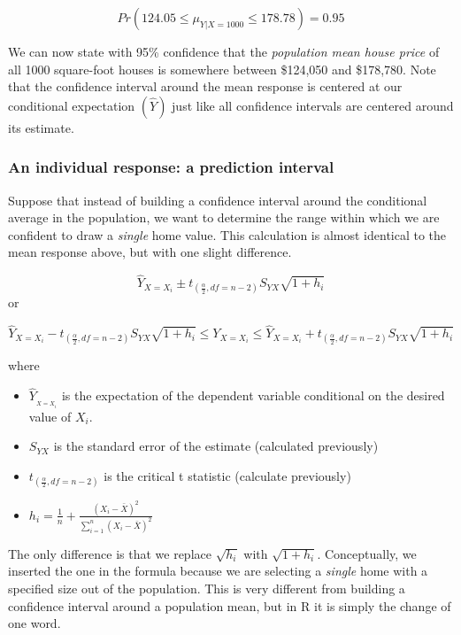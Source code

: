 \documentclass[
]{book}
\begin{document}
\[Pr(124.05\leq\mu_{Y|X=1000}\leq178.78)=0.95\]

We can now state with 95\% confidence that the \emph{population mean house price} of all 1000 square-foot houses is somewhere between \$124,050 and \$178,780. Note that the confidence interval around the mean response is centered at our conditional expectation \((\hat{Y})\) just like all confidence intervals are centered around its estimate.

\hypertarget{an-individual-response-a-prediction-interval}{%
\subsubsection*{An individual response: a prediction interval}\label{an-individual-response-a-prediction-interval}}

Suppose that instead of building a confidence interval around the conditional average in the population, we want to determine the range within which we are confident to draw a \emph{single} home value. This calculation is almost identical to the mean response above, but with one slight difference.

\[ \hat{Y}_{X=X_i} \pm t_{(\frac{\alpha}{2},df=n-2)}S_{YX} \sqrt{1+h_i}\]
or

\[ \hat{Y}_{X=X_i} - t_{(\frac{\alpha}{2},df=n-2)}S_{YX} \sqrt{1+h_i} \leq Y_{X=X_i} \leq \hat{Y}_{X=X_i} + t_{(\frac{\alpha}{2},df=n-2)}S_{YX} \sqrt{1+h_i}\]

where

\begin{itemize}
\item
  \(\hat{Y}__{X=X_i}\) is the expectation of the dependent variable conditional on the desired value of \(X_i\).
\item
  \(S_{YX}\) is the standard error of the estimate (calculated previously)
\item
  \(t_{(\frac{\alpha}{2},df=n-2)}\) is the critical t statistic (calculate previously)
\item
  \(h_i = \frac{1}{n}+\frac{(X_i - \bar{X})^2}{\sum_{i=1}^n(X_i - \bar{X})^2}\)
\end{itemize}

The only difference is that we replace \(\sqrt{h_i}\) with \(\sqrt{1+h_i}\). Conceptually, we inserted the one in the formula because we are selecting a \emph{single} home with a specified size out of the population. This is very different from building a confidence interval around a population mean, but in R it is simply the change of one word.
\end{document}
